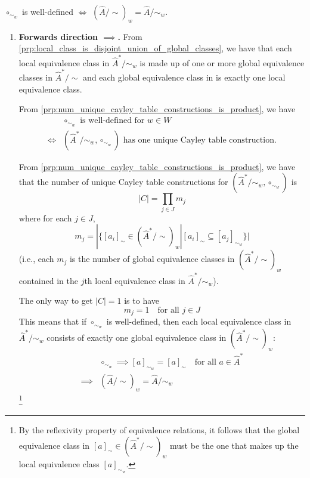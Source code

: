 \begin{propositionE}
    \label{prp:circ_sim_w_is_well_defined_iff_global_sim_coincides_with_local_sim}
    $\circ_{\sim_{w}}$ is well-defined $\iff$ $(\hat{A}/\sim)_{w} = \hat{A}/\sim_{w}$.
\end{propositionE}
\begin{proofE}
\begin{enumerate}[(1)]
    \item \textbf{Forwards direction $\implies$.}
    From \cref{prp:local_class_is_disjoint_union_of_global_classes}, we have that each local equivalence class in $\hat{A}^{*}/\sim_{w}$ is made up of one or more global equivalence classes in $\hat{A}^{*}/\sim$ and each global equivalence class in is exactly one local equivalence class.

    From \cref{prp:num_unique_cayley_table_constructions_is_product}, we have
    \begin{align}
        & \text{$\circ_{\sim_{w}}$ is well-defined for $w \in W$} \\
        \iff & \text{$( \hat{A}^{*}/\sim_{w}, \circ_{\sim_{w}})$ has one unique Cayley table construction.}
    \end{align}

    From \cref{prp:num_unique_cayley_table_constructions_is_product}, we have that the number of unique Cayley table constructions for $(\hat{A}^{*}/\sim_{w}, \circ_{\sim_{w}})$ is
    \begin{equation}
        |C| = \prod_{j \in J} m_{j}
    \end{equation}
    where for each $j \in J$,
    \begin{equation}
        m_{j} = |\{ [a_{i}]_{\sim} \in (\hat{A}^{*}/\sim)_{w} | [a_{i}]_{\sim} \subseteq [a_{j}]_{\sim_{w}} \}|
    \end{equation}
    (i.e., each $m_{j}$ is the number of global equivalence classes in $(\hat{A}^{*}/\sim)_{w}$ contained in the $j$th local equivalence class in $\hat{A}^{*}/\sim_{w}$).
    
    The only way to get $|C| = 1$ is to have
    \begin{equation}
        m_{j} = 1 \quad \text{for all $j \in J$}
    \end{equation}
    This means that if $\circ_{\sim_{w}}$ is well-defined, then each local equivalence class in $\hat{A}^{*}/\sim_{w}$ consists of exactly one global equivalence class in $(\hat{A}^{*}/\sim)_{w}$:
    \begin{align}
        & \circ_{\sim_{w}} \implies [a]_{\sim_{w}} = [a]_{\sim} \quad \text{for all $a \in \hat{A}^{*}$} \\
        \implies & (\hat{A}/\sim)_{w} = \hat{A}/\sim_{w}
    \end{align}
    \footnote{
    By the reflexivity property of equivalence relations, it follows that the global equivalence class in $[a]_{\sim}\in (\hat{A}^{*}/\sim)_{w}$ must be the one that makes up the local equivalence class $[a]_{\sim_{w}}$.
    }


\end{enumerate}
\end{proofE}
